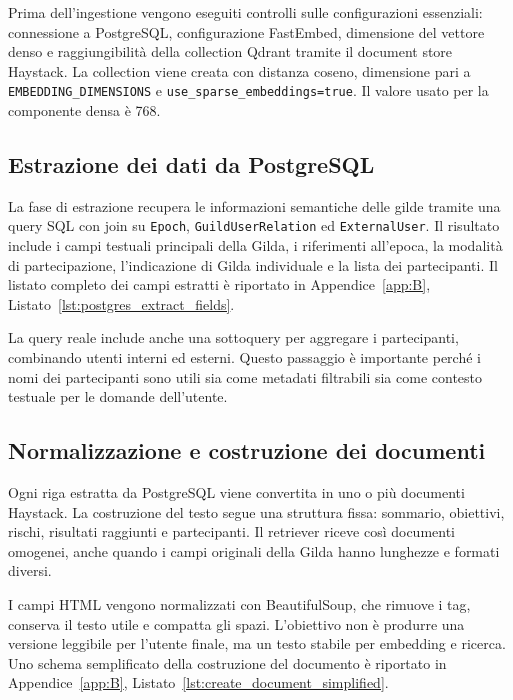 Prima dell'ingestione vengono eseguiti controlli sulle configurazioni essenziali:
connessione a PostgreSQL, configurazione FastEmbed, dimensione del vettore denso
e raggiungibilità della collection Qdrant tramite il document store Haystack. La
collection viene creata con distanza coseno, dimensione pari a
\texttt{EMBEDDING\_DIMENSIONS} e \texttt{use\_sparse\_embeddings=true}. Il
valore usato per la componente densa è 768.

\subsection{Estrazione dei dati da PostgreSQL}
\label{subsec:implementation_postgres_extract}

La fase di estrazione recupera le informazioni semantiche delle gilde tramite
una query SQL con join su \texttt{Epoch},
\texttt{GuildUserRelation} ed \texttt{ExternalUser}. Il risultato include i
campi testuali principali della Gilda, i riferimenti all'epoca, la modalità di
partecipazione, l'indicazione di Gilda individuale e la lista dei partecipanti.
Il listato completo dei campi estratti è riportato in
Appendice~\ref{app:B}, Listato~\ref{lst:postgres_extract_fields}.

La query reale include anche una sottoquery per aggregare i partecipanti,
combinando utenti interni ed esterni. Questo passaggio è importante perché i
nomi dei partecipanti sono utili sia come metadati filtrabili sia come contesto
testuale per le domande dell'utente.

\subsection{Normalizzazione e costruzione dei documenti}
\label{subsec:implementation_document_building}

Ogni riga estratta da PostgreSQL viene convertita in uno o più documenti
Haystack. La costruzione del testo segue una struttura fissa: sommario,
obiettivi, rischi, risultati raggiunti e partecipanti. Il retriever riceve così
documenti omogenei, anche quando i campi originali della Gilda hanno lunghezze
e formati diversi.

I campi HTML vengono normalizzati con BeautifulSoup,
che rimuove i tag, conserva il testo utile e compatta gli spazi. L'obiettivo non
è produrre una versione leggibile per l'utente finale, ma un testo stabile per
embedding e ricerca. Uno schema semplificato della costruzione del documento è
riportato in Appendice~\ref{app:B},
Listato~\ref{lst:create_document_simplified}.

